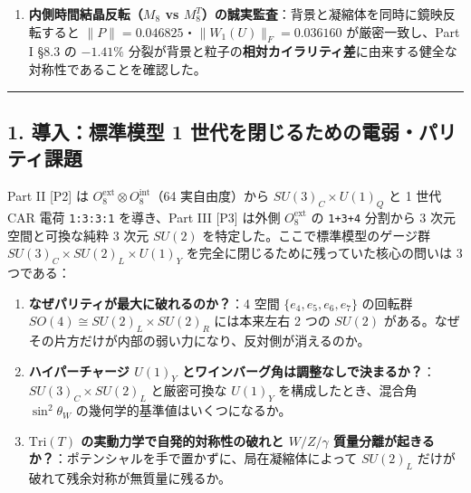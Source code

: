 \documentclass[
  a4paper,
]{ltjsarticle}
\providecommand{\tightlist}{%
  \setlength{\itemsep}{0pt}\setlength{\parskip}{0pt}}
\begin{document}
\begin{enumerate}
  となり、\textbf{\(\sin^2\theta_W^{\mathrm{bare}} = \mathrm{Tr}(T_3^2)/\mathrm{Tr}(Q_{\mathrm{em}}^2) = 3/8 = 0.375000\)}（大統一理論の標準理論値
  \(3/8\) と 6 桁一致）が自動導出される。この幾何比
  \(g'/g = \sqrt{3/5}\)（調整パラメータゼロ）を複素ヒッグス二重項（\(T_3^L=-1/2, Y=+1/2 \Rightarrow Q_{\mathrm{em}}=0\)）の
  4×4 質量行列 \(M^2\) に適用すると、固有値
  \([m_\gamma^2, m_{W^+}^2, m_{W^-}^2, m_Z^2] = [\mathbf{-2.082\times 10^{-17}},\; \mathbf{0.250000},\; \mathbf{0.250000},\; \mathbf{0.400000}]\)、\textbf{\(m_W^2 / m_Z^2 = 5/8 = 0.625000 = \cos^2\theta_W^{\mathrm{bare}}\)}
  が厳密に得られる。
\item
  \textbf{内側時間結晶反転（\(M_8\) vs
  \(M_8^T\)）の誠実監査}：背景と凝縮体を同時に鏡映反転すると
  \(\|P\| = 0.046825\)・\(\|W_1(U)\|_F = 0.036160\) が厳密一致し、Part I
  §8.3 の \(-1.41\%\)
  分裂が背景と粒子の\textbf{相対カイラリティ差}に由来する健全な対称性であることを確認した。
\end{enumerate}

\begin{center}\rule{0.5\linewidth}{0.5pt}\end{center}

\subsection{1. 導入：標準模型 1
世代を閉じるための電弱・パリティ課題}\label{ux5c0eux5165ux6a19ux6e96ux6a21ux578b-1-ux4e16ux4ee3ux3092ux9589ux3058ux308bux305fux3081ux306eux96fbux5f31ux30d1ux30eaux30c6ux30a3ux8ab2ux984c}

Part II {[}P2{]} は
\(O_8^{\mathrm{ext}} \otimes O_8^{\mathrm{int}}\)（64 実自由度）から
\(SU(3)_C \times U(1)_Q\) と 1 世代 CAR 電荷 \texttt{1:3:3:1}
を導き、Part III {[}P3{]} は外側 \(O_8^{\mathrm{ext}}\) の
\texttt{1+3+4} 分割から 3 次元空間と可換な純粋 3 次元 \(SU(2)\)
を特定した。ここで標準模型のゲージ群
\(SU(3)_C \times SU(2)_L \times U(1)_Y\)
を完全に閉じるために残っていた核心の問いは 3 つである：

\begin{enumerate}
\def\labelenumi{\arabic{enumi}.}
\tightlist
\item
  \textbf{なぜパリティが最大に破れるのか？}：4 空間
  \(\{e_4,e_5,e_6,e_7\}\) の回転群
  \(SO(4) \cong SU(2)_L \times SU(2)_R\) には本来左右 2 つの \(SU(2)\)
  がある。なぜその片方だけが内部の弱い力になり、反対側が消えるのか。
\item
  \textbf{ハイパーチャージ \(U(1)_Y\)
  とワインバーグ角は調整なしで決まるか？}：\(SU(3)_C \times SU(2)_L\)
  と厳密可換な \(U(1)_Y\) を構成したとき、混合角 \(\sin^2\theta_W\)
  の幾何学的基準値はいくつになるか。
\item
  \textbf{\(\mathrm{Tri}(T)\) の実動力学で自発的対称性の破れと
  \(W/Z/\gamma\)
  質量分離が起きるか？}：ポテンシャルを手で置かずに、局在凝縮体によって
  \(SU(2)_L\) だけが破れて残余対称が無質量に残るか。
\end{enumerate}
\end{document}
